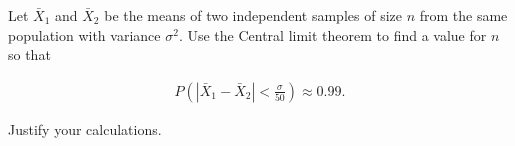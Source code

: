 
\begin{exercise}

Let $\bar X_1$ and $\bar X_2$ be the means of two independent samples of size $n$ from the same population with variance $\sigma^2$.
Use the Central limit theorem to find a value for $n$ so that

\begin{align*}
    P(|\bar X_1 - \bar X_2| < \frac{\sigma}{50}) \approx 0.99.
\end{align*}

Justify your calculations.

\end{exercise}


